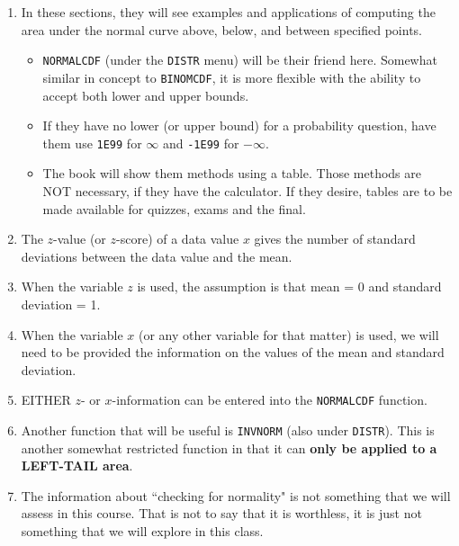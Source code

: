 \documentclass{article}
\begin{document}
    \begin{enumerate}
    
        \item In these sections, they will see examples and applications of computing the area under the normal curve above, below, and between specified points.
        
            \begin{itemize}
            
                \item \texttt{NORMALCDF} (under the \texttt{DISTR} menu) will be their friend here.  Somewhat similar in concept to \texttt{BINOMCDF}, it is more flexible with the ability to accept both lower and upper bounds.
                
                \item If they have no lower (or upper bound) for a probability question, have them use \texttt{1E99} for $\infty$ and \texttt{-1E99} for $-\infty$. 
                
                \item The book will show them methods using a table. Those methods are NOT necessary, if they have the calculator. If they desire, tables are to be made available for quizzes, exams and the final.
                
            \end{itemize}
            
        \item The $z$-value (or $z$-score) of a data value $x$ gives the number of standard deviations between the data value and the mean.
        
        \item When the variable $z$ is used, the assumption is that mean = 0 and standard deviation = 1.
        
        \item When the variable $x$ (or any other variable for that matter) is used, we will need to be provided the information on the values of the mean and standard deviation.
        
        \item EITHER $z$- or $x$-information can be entered into the \texttt{NORMALCDF} function.
        
        \item Another function that will be useful is \texttt{INVNORM} (also under \texttt{DISTR}). This is another somewhat restricted function in that it can \textbf{only be applied to a LEFT-TAIL area}.
        
        \item The information about ``checking for normality" is not something that we will assess in this course.  That is not to say that it is worthless, it is just not something that we will explore in this class.
        
    \end{enumerate}
    
\end{document}
